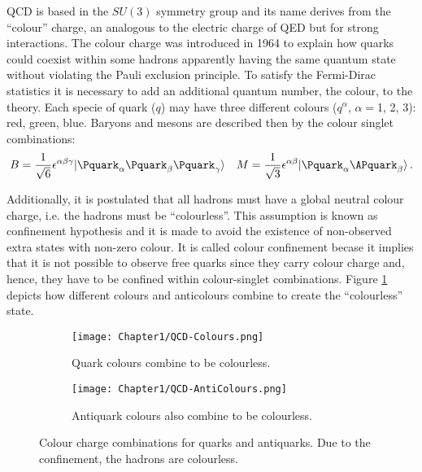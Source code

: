 QCD is based in the $SU(3)$ symmetry group and its name derives from the ``colour'' charge, an analogous to the electric charge of QED but for strong interactions.
The colour charge was introduced in 1964 \cite{Greenberg:1964pe} to explain how quarks could coexist within some hadrons apparently having the same 
quantum state without violating the Pauli exclusion principle. To satisfy the Fermi-Dirac statistics it is necessary to add an additional quantum number, the
colour, to the theory. Each specie of quark ($q$) may have three different colours ($q^{\alpha}$, $\alpha=$1, 2, 3): red, green, blue.
Baryons and mesons are described then by the colour singlet combinations:
\begin{align*}
B = \frac{1}{\sqrt{6}} \epsilon^{\alpha \beta \gamma} \ket{\Pquark_{\alpha}\Pquark_{\beta}\Pquark_{\gamma}} &&  M= \frac{1}{\sqrt{3}} \epsilon^{\alpha \beta} \ket{\Pquark_{\alpha}\APquark_{\beta}} \, .
\end{align*} 

Additionally, it is postulated that all hadrons must have a global neutral colour charge, i.e. the hadrons must be ``colourless''. This assumption is known as 
confinement hypothesis and it is made to avoid the existence of non-observed extra states with non-zero colour. It is called colour confinement becase it implies
that it is not possible to observe free quarks since they carry colour charge and, hence, they have to be confined within colour-singlet combinations.
 Figure \ref{fig:Chap1:ColourCharge}  depicts how different colours and anticolours combine to create the ``colourless'' state.

\begin{figure}
\centering
\begin{subfigure}{.5\textwidth}
  \centering
  \texttt{[image: Chapter1/QCD-Colours.png]}
  \caption{Quark colours combine to be colourless.}
\end{subfigure}%
\begin{subfigure}{.5\textwidth}
  \centering
  \texttt{[image: Chapter1/QCD-AntiColours.png]}
  \caption{Antiquark colours also combine to be colourless.}
\end{subfigure}
\caption{Colour charge combinations for quarks and antiquarks. Due to the confinement, the hadrons are colourless.}
\label{fig:Chap1:ColourCharge}
\end{figure}


